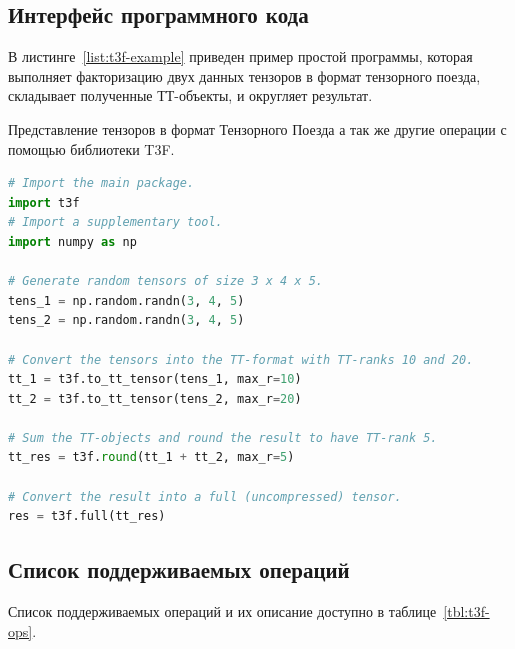 \subsection{Интерфейс программного кода}
В листинге~\ref{list:t3f-example} приведен пример простой программы, которая выполняет факторизацию двух данных тензоров в формат тензорного поезда, складывает полученные ТТ-объекты, и округляет результат.
\begin{ListingEnv}[!h]%
    \caption{Представление тензоров в формат Тензорного Поезда а так же другие операции с помощью библиотеки T3F.}
    \label{list:t3f-example}
    \begin{lstlisting}[language={Python}]
# Import the main package.
import t3f
# Import a supplementary tool.
import numpy as np

# Generate random tensors of size 3 x 4 x 5.
tens_1 = np.random.randn(3, 4, 5)
tens_2 = np.random.randn(3, 4, 5)

# Convert the tensors into the TT-format with TT-ranks 10 and 20.
tt_1 = t3f.to_tt_tensor(tens_1, max_r=10)
tt_2 = t3f.to_tt_tensor(tens_2, max_r=20)

# Sum the TT-objects and round the result to have TT-rank 5.
tt_res = t3f.round(tt_1 + tt_2, max_r=5)

# Convert the result into a full (uncompressed) tensor.
res = t3f.full(tt_res)
    \end{lstlisting}
\end{ListingEnv}%

\subsection{Список поддерживаемых операций}
Список поддерживаемых операций и их описание доступно в таблице~\ref{tbl:t3f-ops}.

